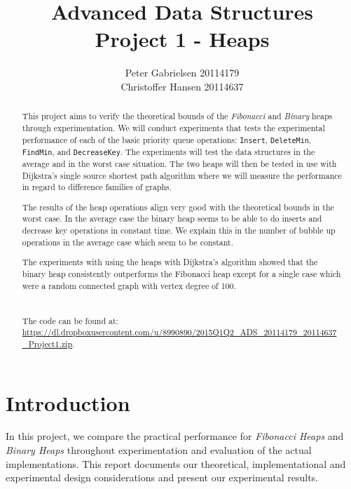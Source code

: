 \documentclass[a4paper,oneside,article,11pt]{memoir}
\title{Advanced Data Structures \\ Project 1 - Heaps}
\author{Peter Gabrielsen 20114179 \\
Christoffer Hansen 20114637}
\begin{document}
\begin{titlingpage}
\clearpage

\maketitle
\thispagestyle{empty}

\begin{abstract}
This project aims to verify the theoretical bounds of the \textit{Fibonacci} and \textit{Binary} heaps through experimentation. We will conduct experiments that tests the experimental performance of each of the basic priority queue operations: \texttt{Insert}, \texttt{DeleteMin}, \texttt{FindMin}, and \texttt{DecreaseKey}.
The experiments will test the data structures in the average and in the worst case situation.
The two heaps will then be tested in use with Dijkstra's single source shortest path algorithm where we will measure the performance in regard to difference families of graphs.

The results of the heap operations align very good with the theoretical bounds in the worst case. In the average case the binary heap seems to be able to do inserts and decrease key operations in constant time. We explain this in the number of bubble up operations in the average case which seem to be constant.

The experiments with using the heaps with Dijkstra's algorithm showed that the binary heap consistently outperforms the Fibonacci heap except for a single case which were a random connected graph with vertex degree of 100.
\\
\\
\\
The code can be found at: \\\url{https://dl.dropboxusercontent.com/u/8990890/2015Q1Q2_ADS_20114179_20114637_Project1.zip}.
\end{abstract}
\end{titlingpage}

\pagebreak

\tableofcontents

\pagebreak

\chapter{Introduction}
In this project, we compare the practical performance for \textit{Fibonacci Heaps} and \textit{Binary Heaps} throughout experimentation and evaluation of the actual implementations. This report documents our theoretical, implementational and experimental design considerations and present our experimental results.
\end{document}
